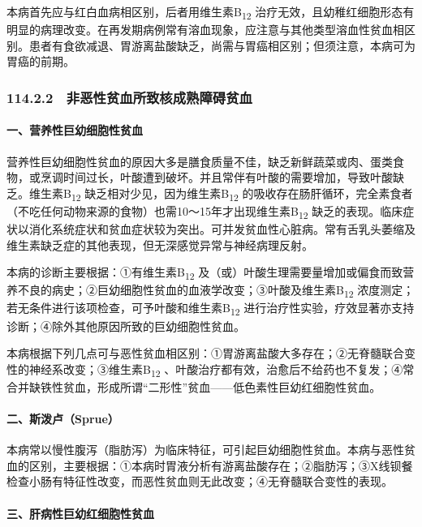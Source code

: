 本病首先应与红白血病相区别，后者用维生素B\textsubscript{12}
治疗无效，且幼稚红细胞形态有明显的病理改变。在再发期病例常有溶血现象，应注意与其他类型溶血性贫血相区别。患者有食欲减退、胃游离盐酸缺乏，尚需与胃癌相区别；但须注意，本病可为胃癌的前期。

\subsubsection{114.2.2　非恶性贫血所致核成熟障碍贫血}

\paragraph{一、营养性巨幼细胞性贫血}

营养性巨幼细胞性贫血的原因大多是膳食质量不佳，缺乏新鲜蔬菜或肉、蛋类食物，或烹调时间过长，叶酸遭到破坏。并且常伴有叶酸的需要增加，导致叶酸缺乏。维生素B\textsubscript{12}
缺乏相对少见，因为维生素B\textsubscript{12}
的吸收存在肠肝循环，完全素食者（不吃任何动物来源的食物）也需10～15年才出现维生素B\textsubscript{12}
缺乏的表现。临床症状以消化系统症状和贫血症状较为突出。可并发贫血性心脏病。常有舌乳头萎缩及维生素缺乏症的其他表现，但无深感觉异常与神经病理反射。

本病的诊断主要根据：①有维生素B\textsubscript{12}
及（或）叶酸生理需要量增加或偏食而致营养不良的病史；②巨幼细胞性贫血的血液学改变；③叶酸及维生素B\textsubscript{12}
浓度测定；若无条件进行该项检查，可予叶酸和维生素B\textsubscript{12}
进行治疗性实验，疗效显著亦支持诊断；④除外其他原因所致的巨幼细胞性贫血。

本病根据下列几点可与恶性贫血相区别：①胃游离盐酸大多存在；②无脊髓联合变性的神经系改变；③维生素B\textsubscript{12}
、叶酸治疗都有效，治愈后不给药也不复发；④常合并缺铁性贫血，形成所谓“二形性”贫血------低色素性巨幼红细胞性贫血。

\paragraph{二、斯泼卢（Sprue）}

本病常以慢性腹泻（脂肪泻）为临床特征，可引起巨幼细胞性贫血。本病与恶性贫血的区别，主要根据：①本病时胃液分析有游离盐酸存在；②脂肪泻；③X线钡餐检查小肠有特征性改变，而恶性贫血则无此改变；④无脊髓联合变性的表现。

\paragraph{三、肝病性巨幼红细胞性贫血}

